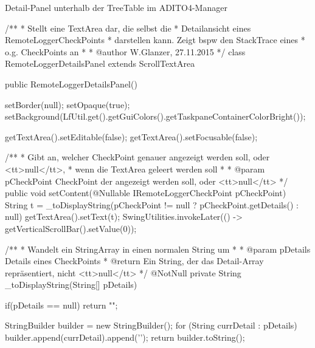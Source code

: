 \newpage
Detail-Panel unterhalb der TreeTable im ADITO4-Manager
\begin{spacing}{0.75}
	\begin{javacode}
/**
 * Stellt eine TextArea dar, die selbst die
 * Detailansicht eines RemoteLoggerCheckPoints
 * darstellen kann. Zeigt bspw den StackTrace eines
 * o.g. CheckPoints an
 *
 * @author W.Glanzer, 27.11.2015
 */
class RemoteLoggerDetailsPanel extends ScrollTextArea
{

  public RemoteLoggerDetailsPanel()
  {
    setBorder(null);
    setOpaque(true);
    setBackground(LfUtil.get().getGuiColors().getTaskpaneContainerColorBright());

    getTextArea().setEditable(false);
    getTextArea().setFocusable(false);
  }

  /**
   * Gibt an, welcher CheckPoint genauer angezeigt werden soll, oder <tt>null</tt>,
   * wenn die TextArea geleert werden soll
   *
   * @param pCheckPoint  CheckPoint der angezeigt werden soll, oder <tt>null</tt>
   */
  public void setContent(@Nullable IRemoteLoggerCheckPoint pCheckPoint)
  {
    String t = _toDisplayString(pCheckPoint != null ? pCheckPoint.getDetails() : null)
    getTextArea().setText(t);
    SwingUtilities.invokeLater(() -> getVerticalScrollBar().setValue(0));
  }

  /**
   * Wandelt ein StringArray in einen normalen String um
   *
   * @param pDetails  Details eines CheckPoints
   * @return Ein String, der das Detail-Array repräsentiert, nicht <tt>null</tt>
   */
  @NotNull
  private String _toDisplayString(String[] pDetails)
  {
    if(pDetails == null)
      return "";

    StringBuilder builder = new StringBuilder();
    for (String currDetail : pDetails)
      builder.append(currDetail).append('\n');
    return builder.toString();
  }
}	\end{javacode}
\end{spacing}

